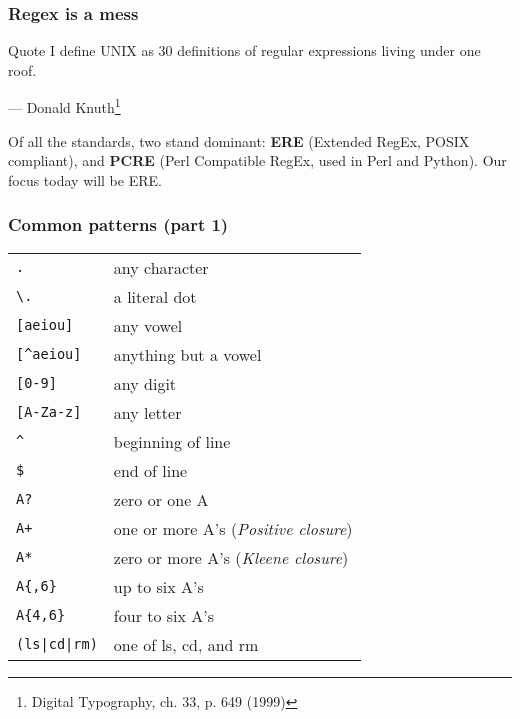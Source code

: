 \begin{frame}
\frametitle{Regex is a mess}
\begin{block}{Quote}
I define UNIX as 30 definitions of regular expressions living under one roof.
\begin{flushright}
    — Donald Knuth\footnote{Digital Typography, ch. 33, p. 649 (1999)}
\end{flushright}
\end{block}

Of all the standards, two stand dominant:
\textbf{ERE} (Extended RegEx, POSIX compliant), and
\textbf{PCRE} (Perl Compatible RegEx, used in Perl and Python).
Our focus today will be ERE.
\end{frame}

\begin{frame}[fragile]
\frametitle{Common patterns (part 1)}
\begin{table}
    \centering
    \begin{tabular}{ll}
        \verb|.|            & any character \\
        \verb|\.|           & a literal dot \\
        \verb|[aeiou]|      & any vowel \\
        \verb|[^aeiou]|     & anything but a vowel \\
        \verb|[0-9]|        & any digit \\
        \verb|[A-Za-z]|     & any letter \\
        \verb|^|            & beginning of line \\
        \verb|$|            & end of line \\
        \verb|A?|           & zero or one A \\
        \verb|A+|           & one or more A's (\emph{Positive closure}) \\
        \verb|A*|           & zero or more A's (\emph{Kleene closure}) \\
        \verb|A{,6}|        & up to six A's \\
        \verb|A{4,6}|       & four to six A's \\
        \verb!(ls|cd|rm)!   & one of ls, cd, and rm
    \end{tabular}
\end{table}
\end{frame}

